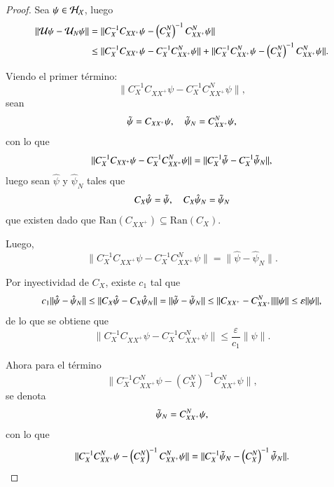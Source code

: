 \begin{proof}
    Sea $\psi \in \mathcal{H}_{\mathcal{X}}$, luego
    \[
    \begin{aligned}
        \| \mathcal{U} \psi - \mathcal{U}_N \psi \| &= \| C_X^{-1} C_{XX^+} \psi - \left (C_X^N \right )^{-1} C_{XX^+}^N \psi \| \\
        & \leq \| C_X^{-1} C_{XX^+} \psi - C_X^{-1} C_{XX^+}^N \psi \| + \| C_X^{-1} C_{XX^+}^N \psi - \left (C_X^N \right )^{-1} C_{XX^+}^N \psi \|.
    \end{aligned}
    \]

    Viendo el primer término:
    \[ \| C_X^{-1} C_{XX^+} \psi - C_X^{-1} C_{XX^+}^N \psi \|, \]
    sean
    \[ \Tilde{\psi} = C_{XX^+} \psi, \quad  \Tilde{\psi}_N = C_{XX^+}^N \psi, \]
    con lo que 
    \[ \| C_X^{-1} C_{XX^+} \psi - C_X^{-1} C_{XX^+}^N \psi \| = \| C_X^{-1} \Tilde{\psi} - C_X^{-1} \Tilde{\psi}_N \|, \]
    luego sean $\hat{\psi}$ y $\hat{\psi}_N$ tales que 
    \[ C_X \hat{\psi} = \Tilde{\psi}, \quad C_X \hat{\psi}_N = \Tilde{\psi}_N \]
    que existen dado que $\text{Ran}(C_{XX^+}) \subseteq \text{Ran}(C_X)$.

    Luego, 
    \[
    \| C_X^{-1} C_{XX^+} \psi - C_X^{-1} C_{XX^+}^N \psi \| = \|\hat{\psi} - \hat{\psi}_N \|.
    \]

    Por inyectividad de $C_X$, existe $c_1$ tal que
    \[
    c_1 \| \hat{\psi} - \hat{\psi}_N  \| \leq \| C_X \hat{\psi} - C_X \hat{\psi}_N \| = \| \Tilde{\psi} - \Tilde{\psi}_N \| \leq \| C_{XX^+} - C_{XX^+}^N \| \| \psi \| \leq \varepsilon \| \psi \|,
    \]
    de lo que se obtiene que 
    \[
    \| C_X^{-1} C_{XX^+} \psi - C_X^{-1} C_{XX^+}^N \psi \| \leq \frac{\varepsilon}{c_1} \| \psi \|.
    \]

    Ahora para el término
    \[
    \| C_X^{-1} C_{XX^+}^N \psi - \left (C_X^N \right )^{-1} C_{XX^+}^N \psi \|,
    \]
    se denota
    \[
    \Tilde{\psi}_N = C_{XX^+}^N \psi,
    \]
    con lo que
    \[
    \| C_X^{-1} C_{XX^+}^N \psi - \left (C_X^N \right )^{-1} C_{XX^+}^N \psi \| = \| C_X^{-1} \Tilde{\psi}_N - \left (C_X^N \right )^{-1} \Tilde{\psi}_N \|.
    \]


\end{proof}
